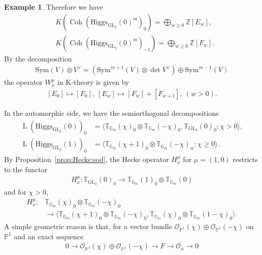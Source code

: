 \documentclass [11pt,oneside,a4paper,mathscr]{amsart}
\theoremstyle{definition}
\newtheorem{example}[thm]{Example}
\renewcommand{\geq}{\geqslant}
\newcommand{\LL}{\operatorname{L}}
\newcommand{\Coh}{\operatorname{Coh}}
\newcommand{\GL}{\operatorname{GL}}
\newcommand{\Hig}{\mathrm{Higgs}}
\begin{document}
\begin{example}
Therefore we have 
\begin{align*}
    &K(\Coh(\Hig_{\GL_2}(0)^{\mathrm{ss}})_0)=\bigoplus_{w\geq 0}\mathbb{Z}[E_w], \\ 
    & K(\Coh(\Hig_{\GL_2}(0)^{\mathrm{ss}})_{-1})=\bigoplus_{w\geq 0}\mathbb{Z}[F_w].
\end{align*}
By the decomposition 
\begin{align*}
    \mathrm{Sym}(V)\otimes V^{\vee}=(\mathrm{Sym}^{m+1}(V)\otimes \det V^{\vee}) \oplus \mathrm{Sym}^{m-1}(V)
\end{align*}
the operator $W_x^{\mu}$ in K-theory is given by 
\begin{align}\label{wilson:GL2}
    [E_0]\mapsto [F_0], \ [E_w] \mapsto [F_w]+[F_{w+1}], \ (w>0).
\end{align}

In the automorphic side, we have the semiorthogonal decompositions 
\begin{align*}
    \LL(\Hig_{\GL_2}(0))_0 
    &=\langle \mathbb{T}_{\mathbb{G}_m}(\chi)_{0}\otimes \mathbb{T}_{\mathbb{G}_m}(-\chi)_0, \mathbb{T}_{\GL_2}(0)_0 : \chi>0\rangle, \\
    \LL(\Hig_{\GL_2}(1))_{0}
    &=\langle \mathbb{T}_{\mathbb{G}_m}(\chi+1)_{0}\otimes \mathbb{T}_{\mathbb{G}_m}(-\chi)_w : \chi\geq 0\rangle.
\end{align*}
By Proposition~\ref{prop:Hecke:sod}, the Hecke operator $H_x^{\mu}$ for $\mu=(1, 0)$ restricts to the functor
    \begin{align*}
        H_x^{\mu} \colon \mathbb{T}_{\GL_2}(0)_0 \to \mathbb{T}_{\mathbb{G}_m}(1)_0\otimes \mathbb{T}_{\mathbb{G}_m}(0)
        \end{align*}
        and for $\chi>0$, 
        \begin{align*}
            H_x^{\mu} \colon &
       \mathbb{T}_{\mathbb{G}_m}(\chi)_{0}\otimes \mathbb{T}_{\mathbb{G}_m}(-\chi)_0 \\
       &\to \langle \mathbb{T}_{\mathbb{G}_m}(\chi+1)_{0}\otimes \mathbb{T}_{\mathbb{G}_m}(-\chi)_0, 
       \mathbb{T}_{\mathbb{G}_m}(\chi)_{0}\otimes \mathbb{T}_{\mathbb{G}_m}(1-\chi)_0\rangle. 
    \end{align*}
    A simple geometric reason is that, for a vector bundle 
    $\mathcal{O}_{\mathbb{P}^1}(\chi)\oplus \mathcal{O}_{\mathbb{P}^1}(-\chi)$ on $\mathbb{P}^1$ and 
    an exact sequence 
    \begin{align*}
        0 \to \mathcal{O}_{\mathbb{P}^1}(\chi)\oplus \mathcal{O}_{\mathbb{P}^1}(-\chi) \to F \to \mathcal{O}_x \to 0
    \end{align*}

\end{example}
\end{document}
